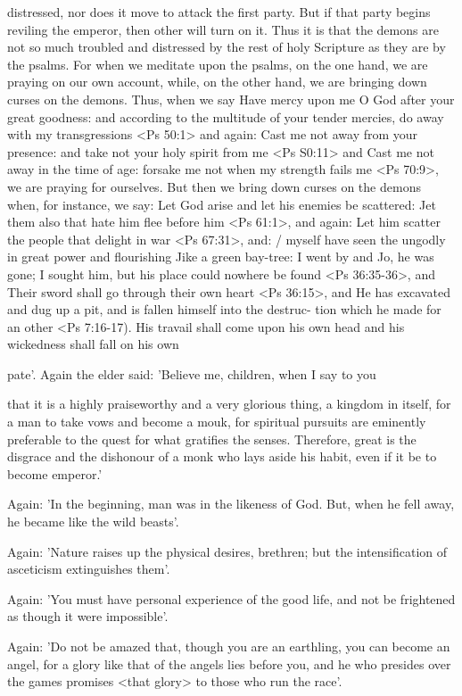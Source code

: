 distressed, nor does it move to attack the first party. But if that
party begins reviling the emperor, then other will turn on it. Thus
it is that the demons are not so much troubled and distressed by the
rest of holy Scripture as they are by the psalms. For when we
meditate upon the psalms, on the one hand, we are praying on our
own account, while, on the other hand, we are bringing down curses
on the demons. Thus, when we say Have mercy upon me O God
after your great goodness: and according to the multitude of your
tender mercies, do away with my transgressions <Ps 50:1> and
again: Cast me not away from your presence: and take not your
holy spirit from me <Ps S0:11> and Cast me not away in the time
of age: forsake me not when my strength fails me <Ps 70:9>, we are
praying for ourselves. But then we bring down curses on the demons
when, for instance, we say: Let God arise and let his enemies be
scattered: Jet them also that hate him flee before him <Ps 61:1>, and
again: Let him scatter the people that delight in war <Ps 67:31>,
and: / myself have seen the ungodly in great power and flourishing
Jike a green bay-tree: I went by and Jo, he was gone; I sought him,
but his place could nowhere be found <Ps 36:35-36>, and Their
sword shall go through their own heart <Ps 36:15>, and He has
excavated and dug up a pit, and is fallen himself into the destruc-
tion which he made for an other <Ps 7:16-17). His travail shall
come upon his own head and his wickedness shall fall on his own

pate'.
Again the elder said: 'Believe me, children, when I say to you

that it is a highly praiseworthy and a very glorious thing, a kingdom
in itself, for a man to take vows and become a mouk, for spiritual
pursuits are eminently preferable to the quest for what gratifies the
senses. Therefore, great is the disgrace and the dishonour of a monk
who lays aside his habit, even if it be to become emperor.'

Again: 'In the beginning, man was in the likeness of God. But,
when he fell away, he became like the wild beasts'.

Again: 'Nature raises up the physical desires, brethren; but the
intensification of asceticism extinguishes them'.

Again: 'You must have personal experience of the good life, and
not be frightened as though it were impossible'.

Again: 'Do not be amazed that, though you are an earthling,
you can become an angel, for a glory like that of the angels lies
before you, and he who presides over the games promises <that
glory> to those who run the race'.


